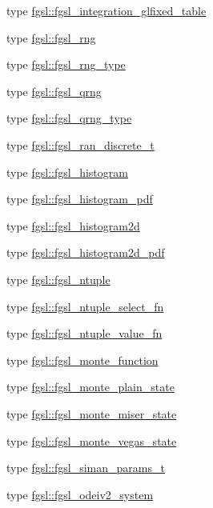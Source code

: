 \begin{DoxyCompactItemize}
type \hyperlink{structfgsl_1_1fgsl__integration__glfixed__table}{fgsl\+::fgsl\+\_\+integration\+\_\+glfixed\+\_\+table}
\item 
type \hyperlink{structfgsl_1_1fgsl__rng}{fgsl\+::fgsl\+\_\+rng}
\item 
type \hyperlink{structfgsl_1_1fgsl__rng__type}{fgsl\+::fgsl\+\_\+rng\+\_\+type}
\item 
type \hyperlink{structfgsl_1_1fgsl__qrng}{fgsl\+::fgsl\+\_\+qrng}
\item 
type \hyperlink{structfgsl_1_1fgsl__qrng__type}{fgsl\+::fgsl\+\_\+qrng\+\_\+type}
\item 
type \hyperlink{structfgsl_1_1fgsl__ran__discrete__t}{fgsl\+::fgsl\+\_\+ran\+\_\+discrete\+\_\+t}
\item 
type \hyperlink{structfgsl_1_1fgsl__histogram}{fgsl\+::fgsl\+\_\+histogram}
\item 
type \hyperlink{structfgsl_1_1fgsl__histogram__pdf}{fgsl\+::fgsl\+\_\+histogram\+\_\+pdf}
\item 
type \hyperlink{structfgsl_1_1fgsl__histogram2d}{fgsl\+::fgsl\+\_\+histogram2d}
\item 
type \hyperlink{structfgsl_1_1fgsl__histogram2d__pdf}{fgsl\+::fgsl\+\_\+histogram2d\+\_\+pdf}
\item 
type \hyperlink{structfgsl_1_1fgsl__ntuple}{fgsl\+::fgsl\+\_\+ntuple}
\item 
type \hyperlink{structfgsl_1_1fgsl__ntuple__select__fn}{fgsl\+::fgsl\+\_\+ntuple\+\_\+select\+\_\+fn}
\item 
type \hyperlink{structfgsl_1_1fgsl__ntuple__value__fn}{fgsl\+::fgsl\+\_\+ntuple\+\_\+value\+\_\+fn}
\item 
type \hyperlink{structfgsl_1_1fgsl__monte__function}{fgsl\+::fgsl\+\_\+monte\+\_\+function}
\item 
type \hyperlink{structfgsl_1_1fgsl__monte__plain__state}{fgsl\+::fgsl\+\_\+monte\+\_\+plain\+\_\+state}
\item 
type \hyperlink{structfgsl_1_1fgsl__monte__miser__state}{fgsl\+::fgsl\+\_\+monte\+\_\+miser\+\_\+state}
\item 
type \hyperlink{structfgsl_1_1fgsl__monte__vegas__state}{fgsl\+::fgsl\+\_\+monte\+\_\+vegas\+\_\+state}
\item 
type \hyperlink{structfgsl_1_1fgsl__siman__params__t}{fgsl\+::fgsl\+\_\+siman\+\_\+params\+\_\+t}
\item 
type \hyperlink{structfgsl_1_1fgsl__odeiv2__system}{fgsl\+::fgsl\+\_\+odeiv2\+\_\+system}
\item 

\end{DoxyCompactItemize}
